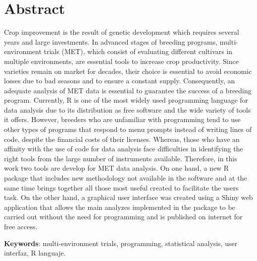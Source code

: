 
\chapter*{Abstract}


Crop improvement is the result of genetic development which requires several years and large investments. In advanced stages of breeding programs, multi-environment trials (MET), which consist of evaluating different cultivars in multiple environments, are essential tools to increase crop productivity. Since varieties remain on market for decades, their choice is essential to avoid economic losses due to bad seasons and to ensure a constant supply. Consequently, an adequate analysis of MET data is essential to guarantee the success of a breeding program. Currently, R is one of the most widely used programming language for data analysis due to its distribution as free software and the wide variety of tools it offers. However, breeders who are unfamiliar with programming tend to use other types of programs that respond to menu prompts instead of writing lines of code, despite the financial costs of their licenses. Whereas, those who have an affinity with the use of code for data analysis face difficulties in identifying the right tools from the large number of instruments available. Therefore, in this work two tools are develop for MET data analysis. On one hand, a new R package that includes new methodology not available in the software and at the same time brings together all those most useful created to facilitate the users task. On the other hand, a graphical user interface was created using a Shiny web application that allows the main analyzes implemented in the package to be carried out without the need for programming and is published on internet for free access. 

\textbf{Keywords}: multi-environment trials, programming, statistical analysis, user interfaz, R languaje.

